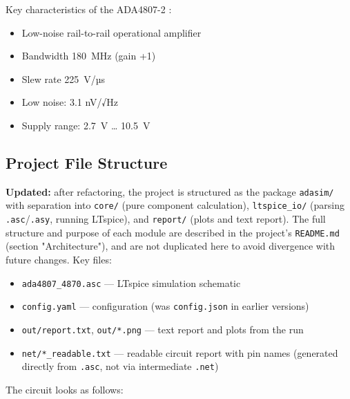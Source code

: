 \documentclass[a4paper, 12pt]{article}
\begin{document}
Key characteristics of the ADA4807-2 \cite{ADA4807_ds}:
\begin{itemize}
  \item Low-noise rail-to-rail operational amplifier
  \item Bandwidth 180~MHz (gain +1)
  \item Slew rate 225~V/µs
  \item Low noise: 3.1 nV/√Hz
  \item Supply range: 2.7~V … 10.5~V
\end{itemize}

\subsection{Project File Structure}

\textbf{Updated:} after refactoring, the project is structured as the package
\texttt{adasim/} with separation into \texttt{core/} (pure component calculation),
\texttt{ltspice\_io/} (parsing \texttt{.asc}/\texttt{.asy}, running LTspice),
and \texttt{report/} (plots and text report). The full structure and purpose of
each module are described in the project's \texttt{README.md} (section "Architecture"),
and are not duplicated here to avoid divergence with future changes. Key files:
\begin{itemize}
  \item \texttt{ada4807\_4870.asc} --- LTspice simulation schematic
  \item \texttt{config.yaml} --- configuration (was \texttt{config.json} in earlier versions)
  \item \texttt{out/report.txt}, \texttt{out/*.png} --- text report and plots from the run
  \item \texttt{net/*\_readable.txt} --- readable circuit report with pin names (generated directly from \texttt{.asc}, not via intermediate \texttt{.net})
\end{itemize}

\par The circuit looks as follows:
\end{document}
